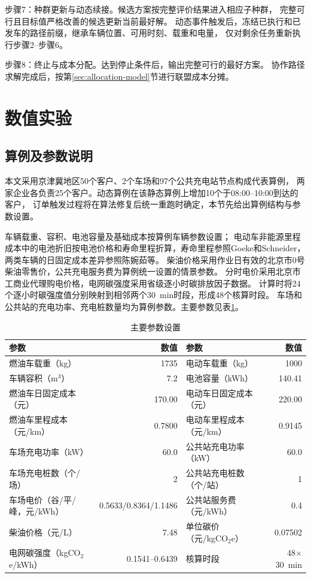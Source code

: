 \documentclass{setp-new}
\begin{document}
步骤7：种群更新与动态续接。候选方案按完整评价结果进入相应子种群，
完整可行且目标值严格改善的候选更新当前最好解。
动态事件触发后，冻结已执行和已发车的路径前缀，继承车辆位置、可用时刻、载重和电量，
仅对剩余任务重新执行步骤2--步骤6。

步骤8：终止与成本分配。达到停止条件后，输出完整可行的最好方案。
协作路径求解完成后，按第\ref{sec:allocation-model}节进行联盟成本分摊。


\section{数值实验}

\subsection{算例及参数说明}

本文采用京津冀地区50个客户、2个车场和97个公共充电站节点构成代表算例，
两家企业各负责25个客户。动态算例在该静态算例上增加10个于08:00--10:00到达的客户，
订单触发过程将在算法修复后统一重跑时确定，本节先给出算例结构与参数设置。

车辆载重、容积、电池容量及基础成本按算例车辆参数设置；
电动车非能源里程成本中的电池折旧按电池价格和寿命里程折算，寿命里程参照Goeke和Schneider\cite{ref:27}，
两类车辆的日固定成本差异参照陈婉茹等\cite{ref:23}。
柴油价格采用作业日有效的北京市0号柴油零售价，公共充电服务费为算例统一设置的情景参数。
分时电价采用北京市工商业代理购电价格，电网碳强度采用省级逐小时碳排放因子数据\cite{ref:82}。
计算时将24个逐小时碳强度值分别映射到相邻两个30~min时段，形成48个核算时段。
车场和公共站的充电功率、充电桩数量均为算例参数。主要参数见表\ref{tab:parameters}。

\begin{table}[H]
  \centering
  \caption{主要参数设置}
  \label{tab:parameters}
  \scriptsize
  \begin{tabular*}{\textwidth}{@{\extracolsep{\fill}}lrlr}
    \toprule
    参数 & 数值 & 参数 & 数值\\
    \midrule
    燃油车载重（kg） & 1735 & 电动车载重（kg） & 1000\\
    车辆容积（m$^3$） & 7.2 & 电池容量（kWh） & 140.41\\
    燃油车日固定成本（元） & 170.00 & 电动车日固定成本（元） & 220.00\\
    燃油车里程成本（元/km） & 0.7800 & 电动车里程成本（元/km） & 0.9145\\
    车场充电功率（kW） & 60.0 & 公共站充电功率（kW） & 60.0\\
    车场充电桩数（个/场） & 2 & 公共站充电桩数（个/站） & 1\\
    车场电价（谷/平/峰，元/kWh） & 0.5633/0.8364/1.1486 & 公共站服务费（元/kWh） & 0.4\\
    柴油价格（元/L） & 7.48 & 单位碳价（元/kgCO$_2$e） & 0.07502\\
    电网碳强度（kgCO$_2$e/kWh） & 0.1541--0.6439 & 核算时段 & 48$\times$30~min\\
    \bottomrule
  \end{tabular*}
\end{table}
\end{document}
